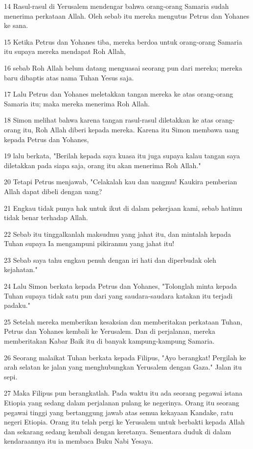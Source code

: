 \par 14 Rasul-rasul di Yerusalem mendengar bahwa orang-orang Samaria sudah menerima perkataan Allah. Oleh sebab itu mereka mengutus Petrus dan Yohanes ke sana.
\par 15 Ketika Petrus dan Yohanes tiba, mereka berdoa untuk orang-orang Samaria itu supaya mereka mendapat Roh Allah,
\par 16 sebab Roh Allah belum datang menguasai seorang pun dari mereka; mereka baru dibaptis atas nama Tuhan Yesus saja.
\par 17 Lalu Petrus dan Yohanes meletakkan tangan mereka ke atas orang-orang Samaria itu; maka mereka menerima Roh Allah.
\par 18 Simon melihat bahwa karena tangan rasul-rasul diletakkan ke atas orang-orang itu, Roh Allah diberi kepada mereka. Karena itu Simon membawa uang kepada Petrus dan Yohanes,
\par 19 lalu berkata, "Berilah kepada saya kuasa itu juga supaya kalau tangan saya diletakkan pada siapa saja, orang itu akan menerima Roh Allah."
\par 20 Tetapi Petrus menjawab, "Celakalah kau dan uangmu! Kaukira pemberian Allah dapat dibeli dengan uang?
\par 21 Engkau tidak punya hak untuk ikut di dalam pekerjaan kami, sebab hatimu tidak benar terhadap Allah.
\par 22 Sebab itu tinggalkanlah maksudmu yang jahat itu, dan mintalah kepada Tuhan supaya Ia mengampuni pikiranmu yang jahat itu!
\par 23 Sebab saya tahu engkau penuh dengan iri hati dan diperbudak oleh kejahatan."
\par 24 Lalu Simon berkata kepada Petrus dan Yohanes, "Tolonglah minta kepada Tuhan supaya tidak satu pun dari yang saudara-saudara katakan itu terjadi padaku."
\par 25 Setelah mereka memberikan kesaksian dan memberitakan perkataan Tuhan, Petrus dan Yohanes kembali ke Yerusalem. Dan di perjalanan, mereka memberitakan Kabar Baik itu di banyak kampung-kampung Samaria.
\par 26 Seorang malaikat Tuhan berkata kepada Filipus, "Ayo berangkat! Pergilah ke arah selatan ke jalan yang menghubungkan Yerusalem dengan Gaza." Jalan itu sepi.
\par 27 Maka Filipus pun berangkatlah. Pada waktu itu ada seorang pegawai istana Etiopia yang sedang dalam perjalanan pulang ke negerinya. Orang itu seorang pegawai tinggi yang bertanggung jawab atas semua kekayaan Kandake, ratu negeri Etiopia. Orang itu telah pergi ke Yerusalem untuk berbakti kepada Allah dan sekarang sedang kembali dengan keretanya. Sementara duduk di dalam kendaraannya itu ia membaca Buku Nabi Yesaya.
